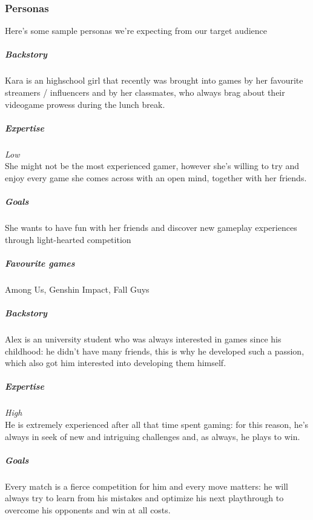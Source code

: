 \subsubsection{Personas}
Here's some sample personas we're expecting from our target audience 



\subparagraph{Backstory}
Kara is an highschool girl that recently was brought into games by her favourite streamers / influencers and by her classmates, who always brag about their videogame prowess during the lunch break.

\subparagraph{Expertise}
\textit{Low} \\
She might not be the most experienced gamer, however she's willing to try and enjoy every game she comes across with an open mind, together with her friends.

\subparagraph{Goals}
She wants to have fun with her friends and discover new gameplay experiences through light-hearted competition

\subparagraph{Favourite games}
Among Us, Genshin Impact, Fall Guys 

\vspace{5mm}




\subparagraph{Backstory}
Alex is an university student who was always interested in games since his childhood: he didn't have many friends, this is why he developed such a passion, which also got him interested into developing them himself.

\subparagraph{Expertise}
\textit{High} \\ 
He is extremely experienced after all that time spent gaming: for this reason, he's always in seek of new and intriguing challenges and, as always, he plays to win.

\subparagraph{Goals}
Every match is a fierce competition for him and every move matters: he will always try to learn from his mistakes and optimize his next playthrough to overcome his opponents and win at all costs.

